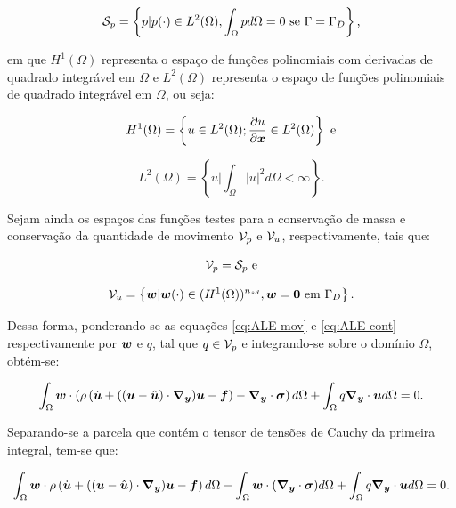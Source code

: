 \begin{equation}
    \mathcal{S}_p=\left\{p|p(\cdot)\in L^2(\Omega),\int_\Omega{pd\Omega}=0\text{ se }\Gamma=\Gamma_D\right\}\text{,}
\end{equation}

\noindent em que $H^1(\Omega)$ representa o espaço de funções polinomiais com derivadas de quadrado integrável em $\Omega$ e $L^2(\Omega)$ representa o espaço de funções polinomiais de quadrado integrável em $\Omega$, ou seja:

\begin{equation}
    H^1(\Omega)=\left\{u\in L^2(\Omega);\frac{\partial{u}}{\partial{\boldsymbol{x}}}\in L^2(\Omega)\right\}\text{ e}
\end{equation}

\begin{equation}
    L^2(\Omega)=\left\{u\big|\int_\Omega{|u|^2d\Omega}<\infty\right\}\text{.}
\end{equation}

Sejam ainda os espaços das funções testes para a conservação de massa e conservação da quantidade de movimento $\mathcal{V}_p$ e $\mathcal{V}_u$, respectivamente, tais que:

\begin{equation}
    \mathcal{V}_p=\mathcal{S}_p\text{ e}
\end{equation}

\begin{equation}
    \mathcal{V}_u=\left\{\boldsymbol{w}|\boldsymbol{w}(\cdot)\in(H^1(\Omega))^{n_{sd}},\boldsymbol{w}=\boldsymbol{0}\text{ em }\Gamma_D\right\}\text{.}
\end{equation}

Dessa forma, ponderando-se as equações \eqref{eq:ALE-mov} e \eqref{eq:ALE-cont} respectivamente por $\boldsymbol{w}$ e $q$, tal que $q\in\mathcal{V}_p$ e integrando-se sobre o domínio $\Omega$, obtém-se:

\begin{equation}
    \int_{\Omega}{\boldsymbol{w}\cdot\left({\rho\left({\dot{\boldsymbol{u}}+((\boldsymbol{u}-\hat{\boldsymbol{u}})\cdot\boldsymbol{\nabla_y})\boldsymbol{u}-\boldsymbol{f}}\right)-\boldsymbol{\nabla_y}\cdot\boldsymbol{\sigma}}\right) d\Omega}+\int_{\Omega}{q\boldsymbol{\nabla_y}\cdot\boldsymbol{u} d\Omega}=0\text{.}
\end{equation}

Separando-se a parcela que contém o tensor de tensões de Cauchy da primeira integral, tem-se que:

\begin{equation}
    \int_{\Omega}{\boldsymbol{w}\cdot\rho\left({\dot{\boldsymbol{u}}+((\boldsymbol{u}-\hat{\boldsymbol{u}})\cdot\boldsymbol{\nabla_y})\boldsymbol{u}-\boldsymbol{f}}\right) d\Omega}-\int_{\Omega}{\boldsymbol{w}\cdot(\boldsymbol{\nabla_y}\cdot\boldsymbol{\sigma}) d\Omega}+\int_{\Omega}{q\boldsymbol{\nabla_y}\cdot\boldsymbol{u} d\Omega}=0\text{.}
    \label{eq:WeakForm1}
\end{equation}

